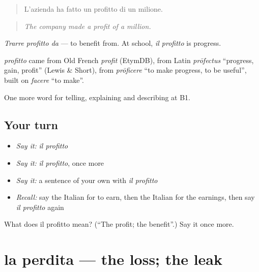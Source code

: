 \begin{quote}
L'azienda ha fatto un profitto di un milione.
\end{quote}

\begin{quote}
\emph{The company made a profit of a million.}
\end{quote}

\emph{Trarre profitto da} — to benefit from. At school, \emph{il profitto} is progress.

\begin{cousinweb}
\emph{profitto} came from Old French \emph{profit} (EtymDB), from Latin \emph{prōfectus} \textquotedblleft{}progress, gain, profit\textquotedblright{} (Lewis \& Short), from \emph{prōficere} \textquotedblleft{}to make progress, to be useful\textquotedblright{}, built on \emph{facere} \textquotedblleft{}to make\textquotedblright{}.
\end{cousinweb}

\begin{grammarlens}[title={What you've built}]
One more word for telling, explaining and describing at B1.
\end{grammarlens}

\subsection*{Your turn}
\begin{itemize}
\raggedright
  \item \emph{Say it:} \emph{il profitto}
  \item \emph{Say it:} \emph{il profitto}, once more
  \item \emph{Say it:} a sentence of your own with \emph{il profitto}
  \item \emph{Recall:} say the Italian for to earn, then the Italian for the earnings, then say \emph{il profitto} again
\end{itemize}

\begin{tcolorbox}[breakable,colback=teal!4,colframe=teal!35!black,title={Before you move on}]
What does il profitto mean? (\textquotedblleft{}The profit; the benefit\textquotedblright{}.) Say it once more.
\end{tcolorbox}
\section[la perdita]{la perdita — the loss; the leak}

